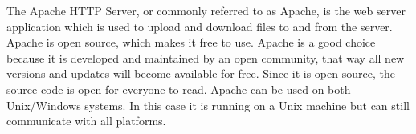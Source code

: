 The Apache HTTP Server, or commonly referred to as Apache, is the web server application which is used to upload and download files to and from the server. Apache is open source, which makes it free to use. Apache is a good choice because it is developed and maintained by an open community, that way all new versions and updates will become available for free. Since it is open source, the source code is open for everyone to read. Apache can be used on both Unix/Windows systems. In this case it is running on a Unix machine but can still communicate with all platforms. 


